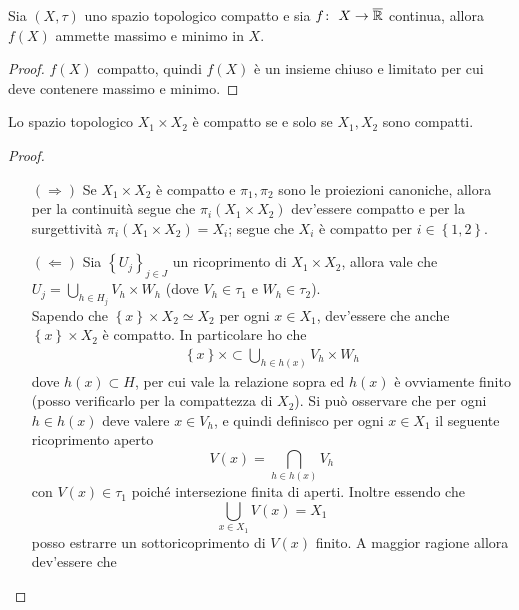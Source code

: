 \begin{corollary}[Weierstrass]
	Sia $(X, \tau)$ uno spazio topologico compatto e sia $f \colon\ X \rightarrow \overline{\mathbb{R}}$ continua, allora $f(X)$ ammette massimo e minimo in $X$.
\end{corollary} 
\begin{proof}
	$f(X)$ compatto, quindi $f(X)$ è un insieme chiuso e limitato per cui deve contenere massimo e minimo.
\end{proof}

\begin{theorem}[Tychonoff]
	Lo spazio topologico $X_1 \times X_2$ è compatto se e solo se $X_1,X_2$ sono compatti. 
\end{theorem} 
\begin{proof}
	\begin{enumerate}
		\item[$(\Rightarrow)$] Se $X_1 \times X_2$ è compatto e $\pi_1, \pi_2$ sono le proiezioni canoniche, allora per la continuità segue che $\pi_i(X_1 \times X_2)$ dev'essere compatto e per la surgettività $ \pi_i(X_1 \times X_2) = X_i$; segue che $X_i$ è compatto per $i \in \left\{1,2\right\}$.
		\item[$(\Leftarrow)$] Sia $\left\{U_j\right\}_{j \in J}$ un ricoprimento di $X_1 \times X_2$, allora vale che $U_j = \bigcup_{h \in H_j} V_h \times W_h$ (dove $V_h \in \tau_1$ e $W_h \in \tau_2$). \\ Sapendo che $\left\{x\right\} \times X_2 \simeq X_2$ per ogni  $x \in X_1$, dev'essere che anche $\left\{x\right\} \times X_2$ è compatto. In particolare ho che 
		\begin{equation}
		\begin{aligned}
			\left\{x\right\} \times \subset \bigcup_{h \in h(x)} V_h \times W_h
		\end{aligned}
		\end{equation}
		dove $h(x) \subset H$, per cui vale la relazione sopra ed $h(x)$ è ovviamente finito (posso verificarlo per la compattezza di $X_2$). Si può osservare che per ogni $h \in h(x)$ deve valere $x \in V_h$, e quindi definisco per ogni $x \in X_1$ il seguente ricoprimento aperto 
		\begin{equation*}
			V(x) = \bigcap_{h \in h(x)} V_h
		\end{equation*}
		con $V(x) \in \tau_1$ poiché intersezione finita di aperti. Inoltre essendo che 
		\begin{equation*}
			\bigcup_{x \in X_1} V(x) = X_1
		\end{equation*}
		posso estrarre un sottoricoprimento di $V(x)$ finito. A maggior ragione allora dev'essere che 

\end{enumerate}
\end{proof}
